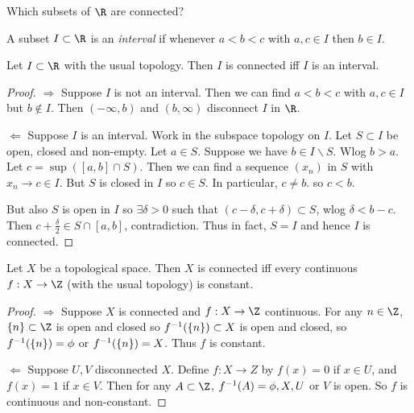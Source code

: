 \begin{question}
Which subsets of $\R$ are connected?
\end{question}

\begin{definition}
A subset $I\subset \R$ is an \emph{interval} if whenever $a<b<c$ with $a,c\in I$ then $b\in I$.
\end{definition}

\begin{proposition} \label{prp:41}      
Let $I\subset \R$ with the usual topology. Then $I$ is connected iff $I$ is an interval.
\end{proposition}

\begin{proof}
\underline{$\Rightarrow$} Suppose $I$ is not an interval. Then we can find $a<b<c$ with $a,c\in I$ but $b\not\in I$. Then $(-\infty,b)$ and $(b,\infty)$ disconnect $I$ in $\R$.

\underline{$\Leftarrow$} Suppose $I$ is an interval. Work in the subspace topology on $I$. Let $S\subset I$ be open, closed and non-empty. Let $a\in S$. Suppose we have $b\in I\backslash S$. Wlog $b>a$. Let $c=\sup([a,b]\cap S).$ Then we can find a sequence $(x_n)$ in $S$ with $x_n\to c\in I$. But $S$ is closed in $I$ so $c\in S$. In particular, $c\neq b$. so $c<b$.

But also $S$ is open in $I$ so $\exists \delta>0$ such that $(c-\delta, c+\delta)\subset S$, wlog $\delta < b-c$. Then $c +\frac{\delta}{2}\in S\cap [a,b]$, contradiction. Thus in fact, $S=I$ and hence $I$ is connected.
\end{proof}

\begin{theorem} \label{thm:42}
Let $X$ be a topological space. Then $X$ is connected iff every continuous $f: X\to \Z$ (with the usual topology) is constant.
\end{theorem}

\begin{proof}
\underline{$\Rightarrow$} Suppose $X$ is connected and $f:X\to \Z$ continuous. For any $n\in \Z$, $\set{n}\subset \Z$ is open and closed so $f^{-1}(\{n\})\subset X$ is open and closed, so $f^{-1}(\{n\})= \phi$ or $f^{-1}(\{n\}) = X$. Thus $f$ is constant.

\underline{$\Leftarrow$} Suppose $U,V$ disconnected $X$. Define $f:X\to Z$ by $f(x) = 0$ if $x\in U$, and $f(x) = 1$ if $x\in V$. Then for any $A\subset \Z$, $f^{-1}(A) = \phi,X,U$ or $V$ is open. So $f$ is continuous and non-constant.
\end{proof}

